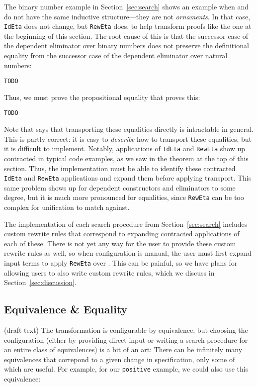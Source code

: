 The binary number example in Section~\ref{sec:search} shows an example when \A and \B do not have the same inductive
structure---they are not \textit{ornaments}. %
In that case, \lstinline{IdEta} does not change, but \lstinline{RewEta} does, to help transform proofs
like the one at the beginning of this section.
The root cause of this is that the successor case of the dependent eliminator over binary numbers does not preserve
the definitional equality from the successor case of the dependent eliminator over natural numbers:

\begin{lstlisting}
TODO
\end{lstlisting}
Thus, we must prove the propositional equality that proves this:

\begin{lstlisting}
TODO
\end{lstlisting}

Note that \citet{tabareau2019marriage} says that transporting these equalities directly
is intractable in general.
This is partly correct: it is easy to \textit{describe} how to transport these equalities,
but it is difficult to implement.
Notably, applications of \lstinline{IdEta} and \lstinline{RewEta} show up contracted in typical code examples,
as we saw in the theorem at the top of this section.
Thus, the implementation must be able to identify these contracted \lstinline{IdEta} and \lstinline{RewEta}
applications and expand them before applying transport.
This same problem shows up for dependent constructors and eliminators to some degree,
but it is much more pronounced for equalities,
since \lstinline{RewEta} can be too complex for unification to match against.

The implementation of each search procedure from Section~\ref{sec:search} includes custom rewrite rules that correspond to expanding
contracted applications of each of these.
There is not yet any way for the user to provide these custom rewrite rules as well,
so when configuration is manual, the user must first expand input terms to apply \lstinline{RewEta} over \A.
This can be painful, so we have plans for allowing users to also write custom rewrite rules,
which we discuss in Section~\ref{sec:discussion}.

\subsection{Equivalence \& Equality}
\label{sec:art}

(draft text) The transformation is configurable by equivalence, but choosing the configuration (either by providing direct input or writing a 
search procedure for an entire class of equivalences) is a bit of an art: There can be infinitely many equivalences that correpond to a 
given change in specification, only some of which are useful.
For example, for our \lstinline{positive} example, we could also use this equivalence:

